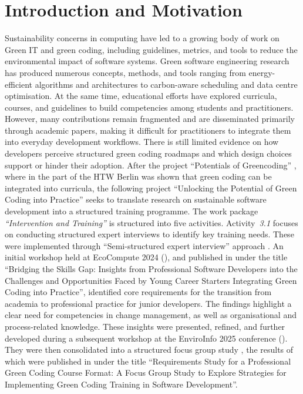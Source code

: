 \documentclass[english]{lni}
\begin{document}
\section{Introduction and Motivation}

Sustainability concerns in computing have led to a growing body of work on Green IT and green coding, including guidelines, metrics, and tools to reduce the environmental impact of software systems. Green software engineering research has produced numerous concepts, methods, and tools ranging from energy-efficient algorithms and architectures to carbon-aware scheduling and data centre optimisation. At the same time, educational efforts have explored curricula, courses, and guidelines to build competencies among students and practitioners. However, many contributions remain fragmented and are disseminated primarily through academic papers, making it difficult for practitioners to integrate them into everyday development workflows. There is still limited evidence on how developers perceive structured green coding roadmaps and which design choices support or hinder their adoption. After the project \enquote{Potentials of Greencoding} \cite{potentialsproject}, where in the part of the HTW Berlin was shown that green coding can be integrated into curricula, the following project \enquote{Unlocking the Potential of Green Coding into Practice} \cite{UnlockingGreenCoding2024} seeks to translate research on sustainable software development into a structured training programme. 
The work package \emph{\enquote{Intervention and Training}} is structured into five activities. Activity~\emph{3.1} focuses on conducting structured expert interviews to identify key training needs. These were implemented through \enquote{Semi-structured expert interview} approach \cite{louklander2025justasking}.
An initial workshop held at EcoCompute 2024 (\cite{ecocompute24}), and published in \cite{junger24-2} under the title \enquote{Bridging the Skills Gap: Insights from Professional Software Developers into the Challenges and Opportunities Faced by Young Career Starters Integrating Green Coding into Practice}, identified core requirements for the transition from academia to professional practice for junior developers. The findings highlight a clear need for competencies in change management, as well as organisational and process-related knowledge.
These insights were presented, refined, and further developed during a subsequent workshop at the EnviroInfo 2025 conference (\cite{enviroInfo25}). They were then consolidated into a structured focus group study \cite{Kitzinger299}, the results of which were published in \cite{JungerWohlgemuth2025} under the title \enquote{Requirements Study for a Professional Green Coding Course Format: A Focus Group Study to Explore Strategies for Implementing Green Coding Training in Software Development}. 
\end{document}
